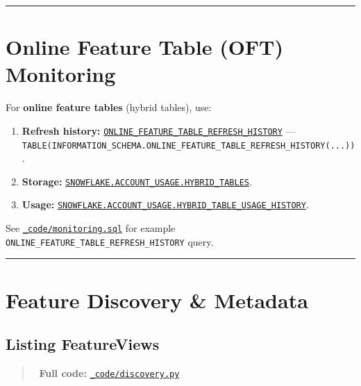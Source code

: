 \documentclass[
  letterpaper,
  DIV=11,
  numbers=noendperiod]{scrreprt}
\providecommand{\tightlist}{%
  \setlength{\itemsep}{0pt}\setlength{\parskip}{0pt}}\usepackage{longtable,booktabs,array}
\begin{document}
\begin{center}\rule{0.5\linewidth}{0.5pt}\end{center}

\hypertarget{online-feature-table-oft-monitoring}{%
\section{Online Feature Table (OFT)
Monitoring}\label{online-feature-table-oft-monitoring}}

For \textbf{online feature tables} (hybrid tables), use:

\begin{enumerate}
\def\labelenumi{\arabic{enumi}.}
\tightlist
\item
  \textbf{Refresh history:}
  \href{https://docs.snowflake.com/en/sql-reference/functions/online-feature-table-refresh-history}{\texttt{ONLINE\_FEATURE\_TABLE\_REFRESH\_HISTORY}}
  ---
  \texttt{TABLE(INFORMATION\_SCHEMA.ONLINE\_FEATURE\_TABLE\_REFRESH\_HISTORY(...))}.
\item
  \textbf{Storage:}
  \href{https://docs.snowflake.com/en/sql-reference/account-usage/hybrid_tables}{\texttt{SNOWFLAKE.ACCOUNT\_USAGE.HYBRID\_TABLES}}.
\item
  \textbf{Usage:}
  \href{https://docs.snowflake.com/en/sql-reference/account-usage/hybrid_table_usage_history}{\texttt{SNOWFLAKE.ACCOUNT\_USAGE.HYBRID\_TABLE\_USAGE\_HISTORY}}.
\end{enumerate}

See \href{_code/monitoring.sql}{\texttt{\_code/monitoring.sql}} for
example \texttt{ONLINE\_FEATURE\_TABLE\_REFRESH\_HISTORY} query.

\begin{center}\rule{0.5\linewidth}{0.5pt}\end{center}

\hypertarget{feature-discovery-metadata}{%
\section{Feature Discovery \&
Metadata}\label{feature-discovery-metadata}}

\hypertarget{listing-featureviews}{%
\subsection{Listing FeatureViews}\label{listing-featureviews}}

\begin{quote}
📁 \textbf{Full code:}
\href{_code/discovery.py}{\texttt{\_code/discovery.py}}
\end{quote}
\end{document}
